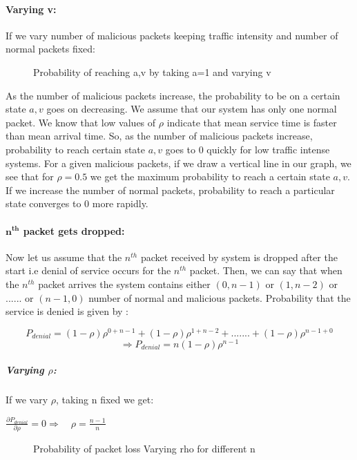 \paragraph{Varying v:} If we vary number of malicious packets keeping traffic intensity and number of normal packets fixed:

\begin{figure}[H]
		\centering
		\caption{{Probability of reaching a,v by taking a=1 and varying v}}
		\label{fig:figb}
\end{figure}


As the number of malicious packets increase, the probability to be on a certain state $a,v$ goes on decreasing. We assume that our system has only one normal packet. We know that low values of $\rho$ indicate that mean service time is faster than mean arrival time. So, as the number of malicious packets increase, probability to reach certain state $a,v$ goes to 0 quickly for low traffic intense systems. For a given malicious packets, if we draw a vertical line in our graph, we see that for $\rho=0.5$ we get the maximum probability to reach a certain state $a,v$. If we increase the number of normal packets, probability to reach a particular state converges to 0 more rapidly. 

\pagebreak

\paragraph{$\mathbf{n^{th}}$ packet gets dropped:}
 Now let us assume that the $n^{th}$ packet received by system is dropped after the start i.e denial of service occurs for the $n^{th}$ packet. Then, we can say that when the $n^{th}$ packet arrives the system contains either $(0,n-1)$ or $(1,n-2)$ or $......$ or $(n-1,0)$ number of normal and malicious packets. Probability that the service is denied is given by :

$$P_{denial} =(1-\rho){{\rho}^{0+n-1}} + (1-\rho){{\rho}^{1+n-2}} + .......  + (1-\rho){{\rho}^{n-1+0}}$$
$$\Rightarrow P_{denial}=n(1-\rho){{\rho}^{n-1}} $$ 

\subparagraph{Varying $\rho$:} If we vary $\rho$, taking n fixed  we get:

\begin{center}
$\frac{\partial P_{denial}}{\partial \rho} = 0 \Rightarrow\quad \rho= \frac{n-1}{n}$ 
\end{center}

\begin{figure}[H]
		\centering
		\caption{{Probability of packet loss Varying rho for different n}}
		\label{fig:figc}
\end{figure}


